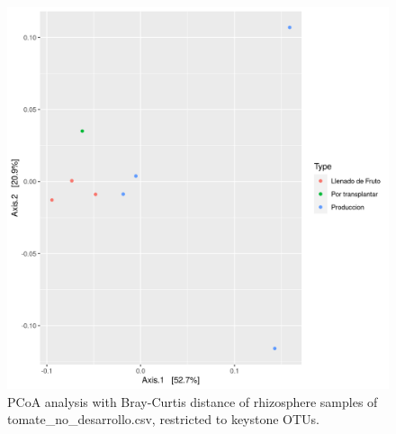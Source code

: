 \begin{figure}
  \centering
  \includegraphics[scale = 0.7]{pcoa_key_otus_tomate_no_desarrollo.csv.png}
  \caption{PCoA analysis with Bray-Curtis distance of rhizosphere samples of tomate_no_desarrollo.csv, restricted to keystone OTUs.}
  \label{fig:tomate_no_desarrollo.csv_pcoa_key_otus}
\end{figure}
